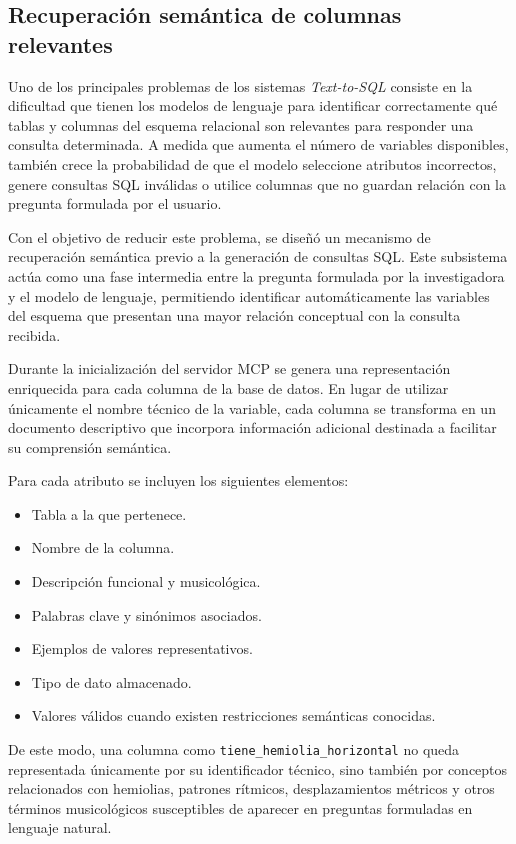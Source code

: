 \subsection{Recuperación semántica de columnas relevantes}
Uno de los principales problemas de los sistemas \textit{Text-to-SQL} consiste en la dificultad que tienen los modelos de lenguaje para identificar correctamente qué tablas y columnas del esquema relacional son relevantes para responder una consulta determinada. A medida que aumenta el número de variables disponibles, también crece la probabilidad de que el modelo seleccione atributos incorrectos, genere consultas SQL inválidas o utilice columnas que no guardan relación con la pregunta formulada por el usuario.

Con el objetivo de reducir este problema, se diseñó un mecanismo de recuperación semántica previo a la generación de consultas SQL. Este subsistema actúa como una fase intermedia entre la pregunta formulada por la investigadora y el modelo de lenguaje, permitiendo identificar automáticamente las variables del esquema que presentan una mayor relación conceptual con la consulta recibida.

Durante la inicialización del servidor MCP se genera una representación enriquecida para cada columna de la base de datos. En lugar de utilizar únicamente el nombre técnico de la variable, cada columna se transforma en un documento descriptivo que incorpora información adicional destinada a facilitar su comprensión semántica.

Para cada atributo se incluyen los siguientes elementos:

\begin{itemize}
\item Tabla a la que pertenece.
\item Nombre de la columna.
\item Descripción funcional y musicológica.
\item Palabras clave y sinónimos asociados.
\item Ejemplos de valores representativos.
\item Tipo de dato almacenado.
\item Valores válidos cuando existen restricciones semánticas conocidas.
\end{itemize}

De este modo, una columna como \texttt{tiene\_hemiolia\_horizontal} no queda representada únicamente por su identificador técnico, sino también por conceptos relacionados con hemiolias, patrones rítmicos, desplazamientos métricos y otros términos musicológicos susceptibles de aparecer en preguntas formuladas en lenguaje natural.

